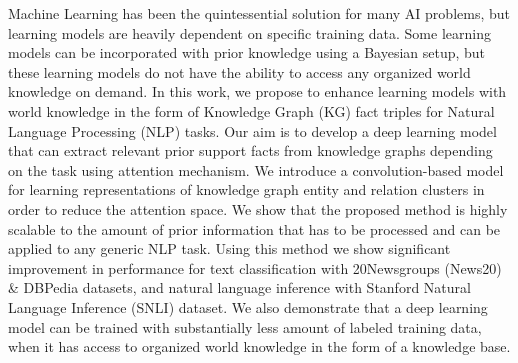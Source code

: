 Machine Learning has been the quintessential solution for many AI problems, but learning models are heavily dependent on specific training data. Some learning models can be incorporated with prior knowledge using a Bayesian setup, but these learning models do not have the ability to access any organized world knowledge on demand.  In this work, we propose to enhance learning models with world knowledge in the form of Knowledge Graph (KG) fact triples for Natural Language Processing (NLP) tasks. Our aim is to develop a deep learning model that can extract relevant prior support facts from knowledge graphs depending on the task using attention mechanism. We introduce a convolution-based model for learning representations of knowledge graph entity and relation clusters in order to reduce the attention space. We show that the proposed method is highly scalable to the amount of prior information that has to be processed and can be applied to any generic NLP task. Using this method we show significant improvement in performance for text classification with 20Newsgroups (News20) \& DBPedia datasets, and natural language inference with Stanford Natural Language Inference (SNLI) dataset. We also demonstrate that a deep learning model can be trained with substantially less amount of labeled training data, when it has access to organized world knowledge in the form of a knowledge base.
